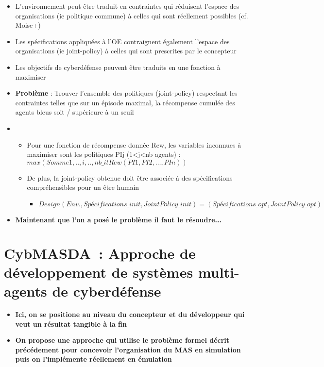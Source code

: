 \begin{itemize}
    \item L'environnement peut être traduit en contraintes qui réduisent l'espace des organisations (ie politique commune) à celles qui sont réellement possibles (cf. Moise+)
    \item Les spécifications appliquées à l'OE contraignent également l'espace des organisations (ie joint-policy) à celles qui sont prescrites par le concepteur
    \item Les objectifs de cyberdéfense peuvent être traduits en une fonction à maximiser
    \item \textbf{Problème} : Trouver l'ensemble des politiques (joint-policy) respectant les contraintes telles que sur un épisode maximal, la récompense cumulée des agents bleus soit / supérieure à un seuil
    \item \begin{itemize}
              \item Pour une fonction de récompense donnée Rew, les variables inconnues à maximiser sont les politiques PIj (1<j<nb agents) :
                    $max (Somme{1, .., i, .., nb\_it} Rew(PI1, PI2, …, PIn))$
              \item De plus, la joint-policy obtenue doit être associée à des spécifications compréhensibles pour un être humain
                    \begin{itemize}
                        \item $Design(Env., Spécifications\_init, JointPolicy\_init) = (Spécifications\_opt, JointPolicy\_opt)$
                    \end{itemize}
          \end{itemize}
    \item \textbf{Maintenant que l'on a posé le problème il faut le résoudre...}
\end{itemize}

\section{CybMASDA : Approche de développement de systèmes multi-agents de cyberdéfense}\label{sec:cybmasda}

\begin{itemize}
    \item \textbf{Ici, on se positione au niveau du concepteur et du développeur qui veut un résultat tangible à la fin}
    \item \textbf{On propose une approche qui utilise le problème formel décrit précédement pour concevoir l'organisation du MAS en simulation puis on l'implémente réellement en émulation}
\end{itemize}

